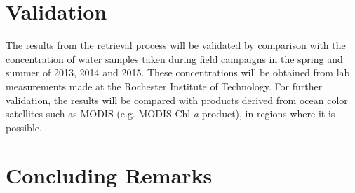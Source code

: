 \section{Validation}
The results from the retrieval process will be validated by comparison with the concentration of water samples taken during field campaigns in the spring and summer of 2013, 2014 and 2015. These concentrations will be obtained from lab measurements made at the Rochester Institute of Technology. For further validation, the results will be compared with products derived from ocean color satellites such as MODIS (e.g. MODIS Chl-{\it a} product), in regions where it is possible.









\section{Concluding Remarks}